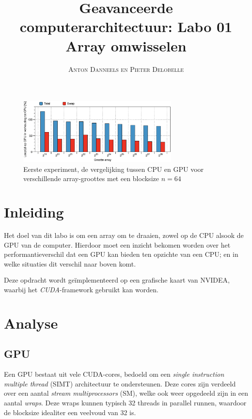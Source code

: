 \documentclass[twocolumn, a4paper]{article}
\begin{document}
\title{Geavanceerde computerarchitectuur: Labo 01 \\ 
\large{Array omwisselen}}
\author{\textsc{Anton Danneels en Pieter Delobelle}}
\date{}
\maketitle


\begin{figure}[h]
  \centering
  \includegraphics[width=0.72\textwidth]{cpu_vs_gpu.eps}
  \caption{Eerste experiment, de vergelijking tussen CPU en GPU voor verschillende array-groottes met een blocksize $n=64$}
  \label{fig:b4_cpu_gpu}
\end{figure}

\section{Inleiding}
Het doel van dit labo is om een array om te draaien, zowel op de CPU alsook de GPU van de computer. 
Hierdoor moet een inzicht bekomen worden over het performantieverschil dat een GPU kan bieden ten opzichte van een CPU; en in welke situaties dit verschil naar boven komt.

Deze opdracht wordt ge\"implementeerd op een grafische kaart van NVIDEA, waarbij het \emph{CUDA}-framework gebruikt kan worden. 

\section{Analyse}

\subsection{GPU}
Een GPU bestaat uit vele CUDA-cores, bedoeld om een \emph{single instruction multiple thread} (SIMT) architectuur te ondersteunen. Deze cores zijn verdeeld over een aantal \emph{stream multiprocessors} (SM), welke ook weer opgedeeld zijn in een aantal \emph{wraps}. Deze wraps kunnen typisch 32 threads in parallel runnen, waardoor de blocksize idealiter een veelvoud van 32 is.
\end{document}
